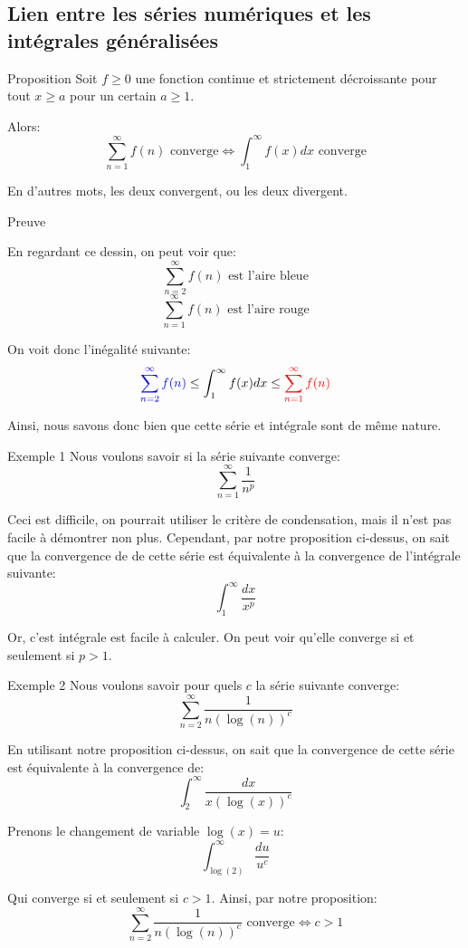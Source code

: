 \documentclass[a4paper]{article}
\begin{document}
\subsection[Séries numériques et intégrales généralisées]{Lien entre les séries numériques et les intégrales généralisées}
\begin{parag}{Proposition}
    Soit $f \geq 0$ une fonction continue et strictement décroissante pour tout $x \geq a$ pour un certain $a \geq 1$. 

    Alors: 
    \[\sum_{n=1}^{\infty} f\left(n\right) \text{ converge} \iff \int_{1}^{\infty} f\left(x\right)dx \text{ converge}\]
    
    En d'autres mots, les deux convergent, ou les deux divergent.

    \begin{subparag}{Preuve}

        En regardant ce dessin, on peut voir que: 
        \[\sum_{n=2}^{\infty} f\left(n\right) \text{ est l'aire bleue}\]
        \[\sum_{n=1}^{\infty} f\left(n\right) \text{ est l'aire rouge}\]
        
        On voit donc l'inégalité suivante: 
        \[{\color{blue}\sum_{n=2}^{\infty} f\left(n\right)} \leq \int_{1}^{\infty} f\left(x\right)dx \leq {\color{red}\sum_{n=1}^{\infty} f\left(n\right)}\]

        Ainsi, nous savons donc bien que cette série et intégrale sont de même nature.
    \end{subparag}
\end{parag}

\begin{parag}{Exemple 1}
    Nous voulons savoir si la série suivante converge: 
    \[\sum_{n=1}^{\infty} \frac{1}{n^p}\]
    
    Ceci est difficile, on pourrait utiliser le critère de condensation, mais il n'est pas facile à démontrer non plus. Cependant, par notre proposition ci-dessus, on sait que la convergence de de cette série est équivalente à la convergence de l'intégrale suivante: 
    \[\int_{1}^{\infty} \frac{dx}{x^p}\]
    
    Or, c'est intégrale est facile à calculer. On peut voir qu'elle converge si et seulement si $p > 1$.
\end{parag}

\begin{parag}{Exemple 2}
    Nous voulons savoir pour quels $c$ la série suivante converge:
    \[\sum_{n=2}^{\infty} \frac{1}{n \left(\log\left(n\right)\right)^c}\]
    
    En utilisant notre proposition ci-dessus, on sait que la convergence de cette série est équivalente à la convergence de: 
    \[\int_{2}^{\infty} \frac{dx}{x\left(\log\left(x\right)\right)^c}\]
    
    Prenons le changement de variable $\log\left(x\right) = u$: 
    \[\int_{\log\left(2\right)}^{\infty} \frac{du}{u^c}\]
    
    Qui converge si et seulement si $c > 1$. Ainsi, par notre proposition: 
    \[\sum_{n=2}^{\infty} \frac{1}{n\left(\log\left(n\right)\right)^c}\text{ converge} \iff c > 1\]
\end{parag}
\end{document}
